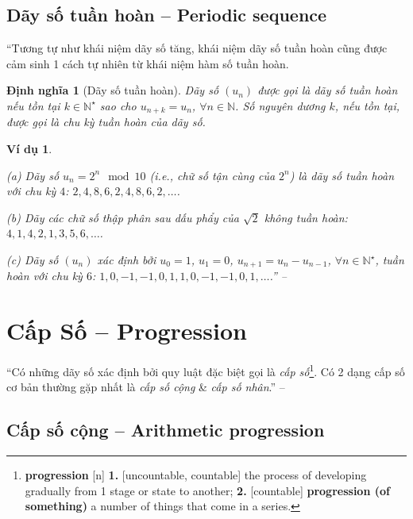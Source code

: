 \documentclass[oneside]{book}
\numberwithin{equation}{section}
\newtheorem{dinhnghia}{Định nghĩa}[section]
\newtheorem{vidu}{Ví dụ}[section]
\begin{document}
\subsection{Dãy số tuần hoàn -- Periodic sequence}
``Tương tự như khái niệm dãy số tăng, khái niệm dãy số tuần hoàn cũng được cảm sinh 1 cách tự nhiên từ khái niệm hàm số tuần hoàn.

\begin{dinhnghia}[Dãy số tuần hoàn]
	Dãy số $(u_n)$ được gọi là \emph{dãy số tuần hoàn} nếu tồn tại $k\in\mathbb{N}^\star$ sao cho $u_{n+k} = u_n$, $\forall n\in\mathbb{N}$. Số nguyên dương $k$, nếu tồn tại, được gọi là \emph{chu kỳ tuần hoàn} của dãy số.
\end{dinhnghia}

\begin{vidu}
	\begin{enumerate*}
		\item[(a)] Dãy số $u_n = 2^n\mod 10$ (i.e., chữ số tận cùng của $2^n$) là dãy số tuần hoàn với chu kỳ $4$: $2,4,8,6,2,4,8,6,2,\ldots$.
		\item[(b)] Dãy các chữ số thập phân sau dấu phẩy của $\sqrt{2}$ không tuần hoàn: $4,1,4,2,1,3,5,6,\ldots$.
		\item[(c)] Dãy số $(u_n)$ xác định bởi $u_0 = 1$, $u_1 = 0$, $u_{n+1} = u_n - u_{n-1}$, $\forall n\in\mathbb{N}^\star$, tuần hoàn với chu kỳ $6$: $1,0,-1,-1,0,1,1,0,-1,-1,0,1,\ldots$.'' -- \cite[p. 121]{TL_chuyen_Toan_Dai_So_Giai_Tich_11}
	\end{enumerate*}
\end{vidu}


\section{Cấp Số -- Progression}
``Có những dãy số xác định bởi quy luật đặc biệt gọi là \textit{cấp số}\footnote{\textbf{progression} [n] \textbf{1.} [uncountable, countable] the process of developing gradually from 1 stage or state to another; \textbf{2.} [countable] \textbf{progression (of something)} a number of things that come in a series.}. Có 2 dạng cấp số cơ bản thường gặp nhất là \textit{cấp số cộng} \& \textit{cấp số nhân}.'' -- \cite[p. 123]{TL_chuyen_Toan_Dai_So_Giai_Tich_11}

\subsection{Cấp số cộng -- Arithmetic progression}
\end{document}
